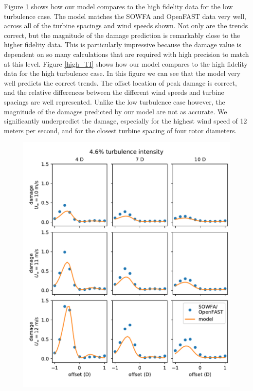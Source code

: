 \documentclass[11pt,letterpaper]{article}
\begin{document}
Figure \ref{low_TI} shows how our model compares to the high fidelity data for the low turbulence case. The model matches the SOWFA and OpenFAST data very well, across all of the turbine spacings and wind speeds shown. Not only are the trends correct, but the magnitude of the damage prediction is remarkably close to the higher fidelity data. This is particularly impressive because the damage value is dependent on so many calculations that are required with high precision to match at this level. 
Figure \ref{high_TI} shows how our model compares to the high fidelity data for the high turbulence case. In this figure we can see that the model very well predicts the correct trends. The offset location of peak damage is correct, and the relative differences between the different wind speeds and turbine spacings are well represented. Unlike the low turbulence case however, the magnitude of the damages predicted by our model are not as accurate. We significantly underpredict the damage, especially for the highest wind speed of 12 meters per second, and for the closest turbine spacing of four rotor diameters.
% 
\begin{figure}
    \centering
    \includegraphics{images/lowTI_damage.pdf}
    \caption{}
    \label{low_TI}
\end{figure}
\end{document}
